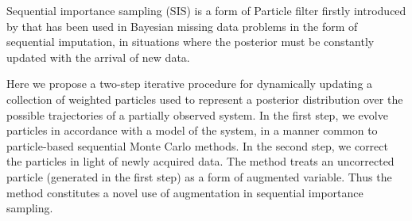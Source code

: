 Sequential importance sampling (SIS) is a form of Particle filter firstly introduced by \cite{Kong} that has been used in Bayesian missing data problems in the form of sequential imputation, in situations where the posterior must be constantly updated with the arrival of new data.

Here we propose a two-step iterative procedure for dynamically updating a collection of weighted particles used to represent a posterior distribution over the possible trajectories of a partially observed system. In the first step, we evolve particles in accordance with a model of the system, in a manner common to particle-based sequential Monte Carlo methods. In the second step, we correct the particles in light of newly acquired data. The method treats an uncorrected particle (generated in the first step) as a form of augmented variable. Thus the method constitutes a novel use of augmentation in sequential importance sampling. 


